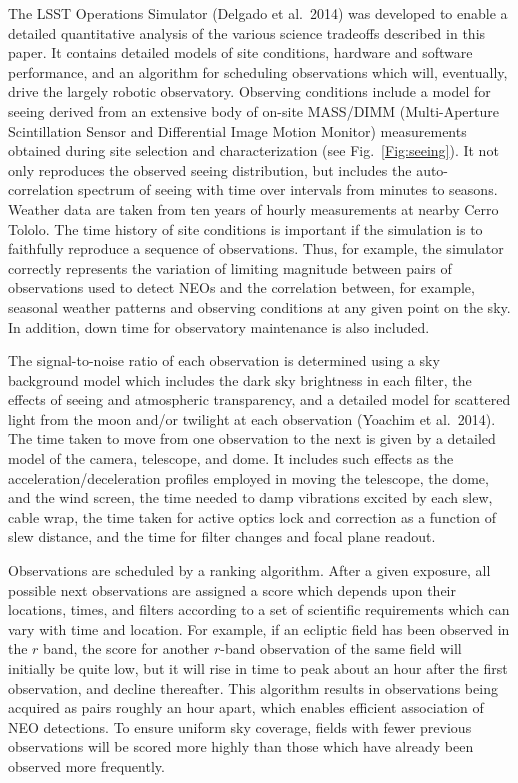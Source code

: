 {The LSST Operations Simulator (Delgado et al.~2014) was developed to enable a
detailed quantitative analysis of the various science tradeoffs described in
this paper. It contains detailed models of site conditions, hardware and
software performance, and an algorithm for scheduling observations which will,
eventually, drive the largely robotic observatory.
Observing conditions include a model for seeing derived from an extensive body
of on-site MASS/DIMM (Multi-Aperture Scintillation Sensor and Differential
Image Motion Monitor) measurements obtained during site selection and
characterization (see Fig.~\ref{Fig:seeing}). It not only reproduces the
observed seeing distribution, but includes
the auto-correlation spectrum of seeing with time over intervals from minutes
to seasons. Weather data are taken from ten years of hourly measurements at
nearby Cerro Tololo. The time history of site conditions is important if the
simulation is to faithfully reproduce a sequence of observations. Thus, for
example, the simulator correctly represents the variation of limiting
magnitude between pairs of observations used to detect NEOs and the
correlation between, for example, seasonal weather patterns and observing
conditions at any given point on the sky.  In addition, down time for
observatory maintenance is also included.

The signal-to-noise ratio of each
observation is determined using a sky background model which includes the dark
sky brightness in each filter, the effects of seeing and atmospheric
transparency, and a detailed model for scattered light from the moon and/or
twilight at each observation (Yoachim et al.~2014). The time taken to move from one observation to
the next is given by a detailed model of the camera, telescope, and dome. It
includes such effects as the acceleration/deceleration profiles employed in
moving the telescope, the dome, and the wind screen,
the time needed to damp vibrations excited by each slew,
cable wrap, the time taken for active optics lock and correction as a function of
slew distance, and the time for filter changes and focal plane readout.

Observations are scheduled by a ranking algorithm. After a given exposure, all
possible next observations are assigned a score which depends upon their locations, times,
and filters according to a set of scientific requirements which can vary with
time and location. For example, if an ecliptic field has been observed in the
$r$ band, the score for another $r$-band observation of the same field will
initially be quite low, but it will rise in time to peak about an hour after
the first observation, and decline thereafter. This algorithm results in
observations being acquired as pairs roughly an hour apart, which enables
efficient association of NEO detections. To ensure uniform
sky coverage, fields with fewer previous observations will be scored more
highly than those which have already been observed more frequently.

}
